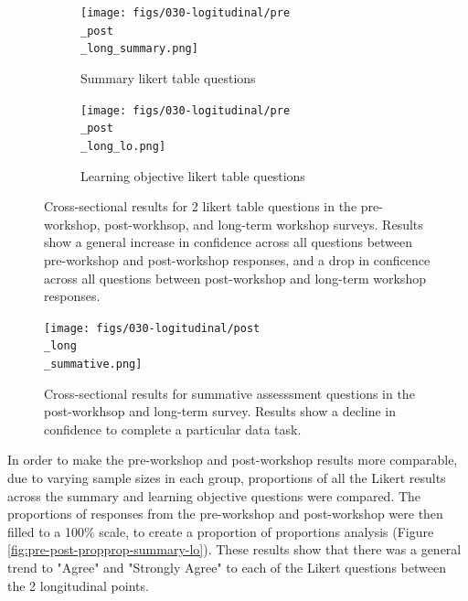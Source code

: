 \documentclass[030-workshop.tex]{subfiles}
\begin{document}
        \begin{figure}[!hbtp]
            \centering
            \begin{subfigure}[h]{0.45\textwidth}
                \centering
                \texttt{[image: figs/030-logitudinal/pre\\\_post\\\_long\_summary.png]}
                \caption[Pre-Post-workshop and Long-term Survey for summary likert questions]
                {Summary likert table questions}
                \label{sfig:pre-post-long-summary}
            \end{subfigure}
            \hfill
            \begin{subfigure}[h]{0.45\textwidth}
                \centering
                \texttt{[image: figs/030-logitudinal/pre\\\_post\\\_long\_lo.png]}
                \caption[Pre-Post-workshop and Long-term Survey for learning objective likert questions]
                {Learning objective likert table questions}
                \label{sfig:pre-post-long-lo}
            \end{subfigure}
            \caption[Summary table and learning objective likert questions (pre, post, long-term)]
            {Cross-sectional results for 2 likert table questions in the
                pre-workshop, post-workhsop, and long-term workshop surveys.
                Results show a general increase in confidence across all questions between pre-workshop and post-workshop responses,
                and a drop in conficence across all questions between post-workshop and long-term workshop responses.
            }
            \label{fig:pre-post-long-summary-lo}
        \end{figure}

        \begin{figure}[!hbtp]
            \centering
            \texttt{[image: figs/030-logitudinal/post\\\_long\\\_summative.png]}
            \caption[Summative assessment likert questions (post, long-term)]
            {Cross-sectional results for summative assesssment questions in the
                post-workhsop and long-term survey.
                Results show a decline in confidence to complete a particular data task.
            }
            \label{fig:post-long-summative}
        \end{figure}

        In order to make the pre-workshop and post-workshop results more comparable,
        due to varying sample sizes in each group,
        proportions of all the Likert results across the summary and learning objective questions were compared.
        The proportions of responses from the pre-workshop and post-workshop were then filled to a 100\% scale,
        to create a proportion of proportions analysis (Figure \ref{fig:pre-post-propprop-summary-lo}).
        These results show that there was a general trend to "Agree" and "Strongly Agree" to each of the Likert questions
        between the 2 longitudinal points.
\end{document}
